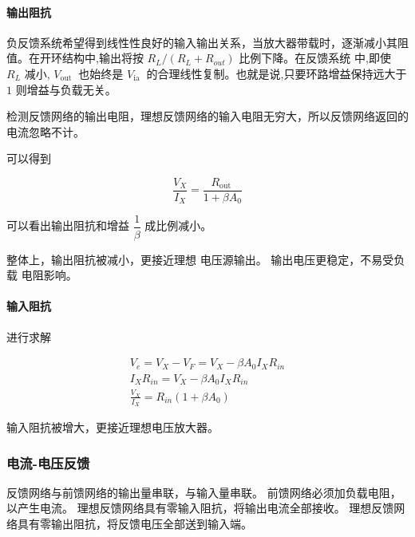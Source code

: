 \documentclass[cn,11pt,chinese,black,simple]{../elegantbook}
\begin{document}

\paragraph{输出阻抗}

负反馈系统希望得到线性性良好的输入输出关系，当放大器带载时，逐渐减小其阻值。在开环结构中,输出将按 \(R_{ L } /\left(R_{ L }+R_{ out }\right)\) 比例下降。在反馈系统 中,即使 \(R_{ L }\) 减小, \(V_{\text {out }}\) 也始终是 \(V_{\text {ia }}\) 的合理线性复制。也就是说,只要环路增益保持远大于 \(1\) 则增益与负载无关。


检测反馈网络的输出电阻，理想反馈网络的输入电阻无穷大，所以反馈网络返回的电流忽略不计。


可以得到

\[\frac{V_{X}}{I_{X}}=\frac{R_{\text {out }}}{1+\beta A_{0}}\]

可以看出输出阻抗和增益 \(\dfrac{1}{\beta}\) 成比例减小。

整体上，输出阻抗被减小，更接近理想
电压源输出。
输出电压更稳定，不易受负载
电阻影响。

\paragraph{输入阻抗}



进行求解

\[\begin{array}{l}
    V_{e}= V _{X}-V_{F}=V_{X}-\beta A_{0} I_{X} R_{i n} \\
    I_{X} R_{i n}= V _{X}-\beta A_{0} I_{X} R_{i n} \\
    \frac{V_{X}}{I_{X}}=R_{i n}\left(1+\beta A_{0}\right)
\end{array}\]

输入阻抗被增大，更接近理想电压放大器。

\subsubsection{电流-电压反馈}

反馈网络与前馈网络的输出量串联，与输入量串联。
前馈网络必须加负载电阻，以产生电流。
理想反馈网络具有零输入阻抗，将输出电流全部接收。
理想反馈网络具有零输出阻抗，将反馈电压全部送到输入端。
\end{document}
